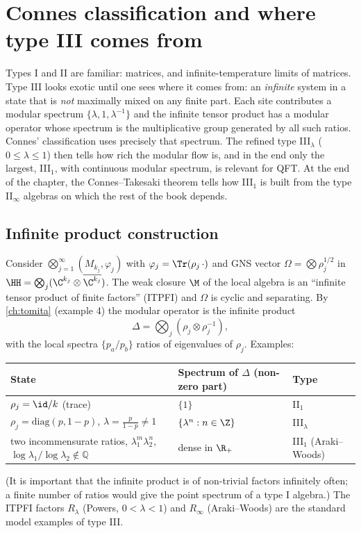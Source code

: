 \chapter{Connes classification and where type III comes from}\label{ch:connes_class}

\begin{physmotiv}
Types I and II are familiar: matrices, and infinite-temperature limits of matrices. Type III looks exotic until one sees where it comes from: an \emph{infinite} system in a state that is \emph{not} maximally mixed on any finite part. Each site contributes a modular spectrum $\{\lambda,1,\lambda^{-1}\}$ and the infinite tensor product has a modular operator whose spectrum is the multiplicative group generated by all such ratios. Connes' classification uses precisely that spectrum. The refined type III$_\lambda$ ($0\le\lambda\le1$) then tells how rich the modular flow is, and in the end only the largest, III$_1$, with continuous modular spectrum, is relevant for QFT. At the end of the chapter, the Connes--Takesaki theorem tells how III$_1$ is built from the type II$_\infty$ algebras on which the rest of the book depends.
\end{physmotiv}

\section{Infinite product construction}

Consider $\bigotimes_{j=1}^\infty(M_{k_j},\varphi_j)$ with $\varphi_j=\Tr(\rho_j\,\cdot)$ and GNS vector $\Omega=\bigotimes\rho_j^{1/2}$ in $\HH=\bigotimes_j(\C^{k_j}\otimes\overline{\C^{k_j}})$. The weak closure $\M$ of the local algebra is an ``infinite tensor product of finite factors'' (ITPFI) and $\Omega$ is cyclic and separating. By \cref{ch:tomita} (example 4) the modular operator is the infinite product
\begin{equation}
\Delta=\bigotimes_j(\rho_j\otimes\rho_j^{-1}),
\end{equation}
with the local spectra $\{p_a/p_b\}$ ratios of eigenvalues of $\rho_j$. Examples:

\begin{center}
\renewcommand{\arraystretch}{1.3}
\begin{tabular}{@{}lll@{}}
\toprule
State & Spectrum of $\Delta$ (non-zero part) & Type\\
\midrule
$\rho_j=\id/k$ (trace) & $\{1\}$ & II$_1$\\
$\rho_j=\mathrm{diag}(p,1-p)$, $\lambda=\tfrac{p}{1-p}\ne1$ & $\{\lambda^n:n\in\Z\}$ & III$_\lambda$\\
two incommensurate ratios, $\lambda_1^m\lambda_2^n$, $\log\lambda_1/\log\lambda_2\notin\mathbb Q$ & dense in $\R_+$ & III$_1$ (Araki--Woods)\\
\bottomrule
\end{tabular}
\end{center}
(It is important that the infinite product is of non-trivial factors infinitely often; a finite number of ratios would give the point spectrum of a type I algebra.) The ITPFI factors $R_\lambda$ (Powers, $0<\lambda<1$) and $R_\infty$ (Araki--Woods) are the standard model examples of type III.

